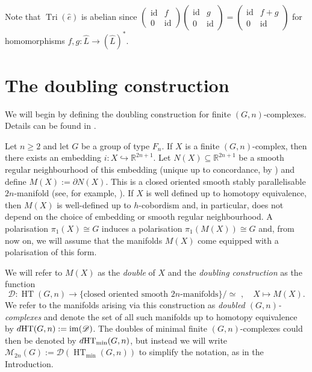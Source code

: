 \documentclass[11pt,a4paper,leqno]{amsart}
\theoremstyle{definition}
\theoremstyle{remark}
\newcommand{\wh}{\widehat}
\newcommand{\R}{\mathbb{R}}
\DeclareMathOperator{\id}{id}
\DeclareMathOperator{\IM}{im}
\DeclareMathOperator{\HT}{HT}
\DeclareMathOperator{\TriIsom}{Tri}
\renewcommand{\L}{L}
\newcommand{\dHT}{d\text{\normalfont HT}}
\newcommand{\sM}{\mathscr{M}}
\newcommand{\bd}{\partial}
\begin{document}
Note that $\TriIsom(\wh e)$ is abelian since $ \left(\begin{smallmatrix} \id & f \\ 0 & \id \end{smallmatrix}\right) \left(\begin{smallmatrix} \id & g \\ 0 & \id \end{smallmatrix}\right) =  \left(\begin{smallmatrix} \id & f+g \\ 0 & \id \end{smallmatrix}\right)$ for homomorphisms $f,g \colon \wh \L \to (\wh \L)^*$.

\section{The doubling construction} \label{s:doubling-construction}

We will begin by defining the doubling construction for finite $(G,n)$-complexes. Details can be found in \cite[Section II]{Kreck:1984}. 

Let $n \ge 2$ and let $G$ be a group of type $F_n$. If $X$ is a finite $(G,n)$-complex, then there exists an embedding $i\colon  X \hookrightarrow \R^{2n+1}$. Let $N(X) \subseteq \R^{2n+1}$ be a smooth regular neighbourhood of this embedding (unique up to concordance, by \cite[p76]{Wall:1966}) and define $M(X) := \bd N(X)$. This is a closed oriented smooth stably parallelisable $2n$-manifold (see, for example, \cite[p15]{Kreck:1984}).
If $X$ is well defined up to homotopy equivalence, then $M(X)$ is well-defined up to $h$-cobordism and, in particular, does not depend on the choice of embedding or smooth regular neighbourhood.  A polarisation $\pi_1(X) \cong G$ induces a polarisation $\pi_1(M(X)) \cong G$ and, from now on, we will assume that the manifolds $M(X)$ come equipped with a polarisation of this form.

We will refer to $M(X)$ as the \textit{double} of $X$ and the \textit{doubling construction} as the function
\[ \mathscr{D}\colon  \HT(G,n) \to \{\text{closed oriented smooth $2n$-manifolds}\} / \simeq \,\, , \quad X \mapsto M(X). \]
We refer to the manifolds arising via this construction as \textit{doubled $(G,n)$-complexes} and denote the set of all such manifolds up to homotopy equivalence by
$\dHT(G,n) := \IM(\mathscr{D})$. 
The doubles of minimal finite $(G,n)$-complexes could then be denoted by $\dHT_{\min}(G,n)$, but instead we will write $\sM_{2n}(G) := \mathscr{D}(\HT_{\min}(G,n))$ to simplify the notation, as in the Introduction. 
\end{document}
